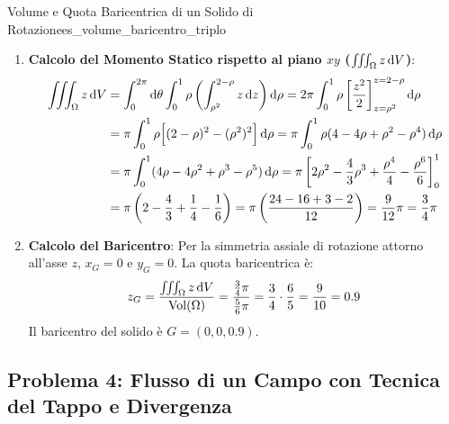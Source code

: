 \begin{esempio}{Volume e Quota Baricentrica di un Solido di Rotazione}{es_volume_baricentro_triplo}
\begin{enumerate}
    \item \textbf{Calcolo del Momento Statico rispetto al piano $xy$ ($\iiint_\Omega z \mathop{}\!\mathrm{d} V$)}:
    \begin{align*}
    \iiint_\Omega z \dV &= \int_{0}^{2\pi} \dtheta \int_{0}^{1} \rho \left( \int_{\rho^2}^{2-\rho} z \dz \right) \drho = 2\pi \int_{0}^{1} \rho \left[ \frac{z^2}{2} \right]_{z=\rho^2}^{z=2-\rho} \drho \\
    &= \pi \int_{0}^{1} \rho \Big[ (2 - \rho)^2 - (\rho^2)^2 \Big] \drho = \pi \int_{0}^{1} \rho (4 - 4\rho + \rho^2 - \rho^4) \drho \\
    &= \pi \int_{0}^{1} (4\rho - 4\rho^2 + \rho^3 - \rho^5) \drho = \pi \left[ 2\rho^2 - \frac{4}{3}\rho^3 + \frac{\rho^4}{4} - \frac{\rho^6}{6} \right]_0^1 \\
    &= \pi \left( 2 - \frac{4}{3} + \frac{1}{4} - \frac{1}{6} \right) = \pi \left( \frac{24 - 16 + 3 - 2}{12} \right) = \frac{9}{12}\pi = \frac{3}{4}\pi
    \end{align*}

    \item \textbf{Calcolo del Baricentro}:
    Per la simmetria assiale di rotazione attorno all'asse $z$, $x_G = 0$ e $y_G = 0$.
    La quota baricentrica è:
    \[
    z_G = \frac{\iiint_\Omega z \mathop{}\!\mathrm{d} V}{\operatorname{Vol}(\Omega)} = \frac{\frac{3}{4}\pi}{\frac{5}{6}\pi} = \frac{3}{4} \cdot \frac{6}{5} = \frac{9}{10} = 0.9
    \]
    Il baricentro del solido è $G = (0, 0, 0.9)$.
\end{enumerate}
\end{esempio}

\subsection{Problema 4: Flusso di un Campo con Tecnica del Tappo e Divergenza}

